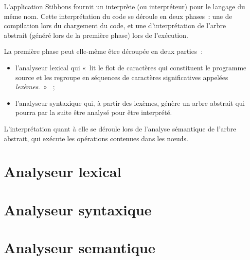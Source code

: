 L'application Stibbons fournit un interprète (ou interpréteur) pour le langage du même nom. Cette interprétation du code se déroule en deux phases~: une de compilation lors du chargement du code, et une d'interprétation de l'arbre abstrait (généré lors de la première phase) lors de l'exécution.

La première phase peut elle-même être découpée en deux parties~:
\begin{itemize}
\item l'analyseur lexical qui «~lit le flot de caractères qui constituent le programme source et les regroupe en séquences de caractères significatives appelées \emph{lexèmes}.~» \cite{compilateurs}~;
\item l'analyseur syntaxique qui, à partir des lexèmes, génère un arbre abstrait qui pourra par la suite être analysé pour être interprété.
\end{itemize}

L'interprétation quant à elle se déroule lors de l'analyse sémantique de l'arbre abstrait, qui exécute les opérations contenues dans les nœuds.

\section{Analyseur lexical}


\section{Analyseur syntaxique}


\section{Analyseur semantique}

